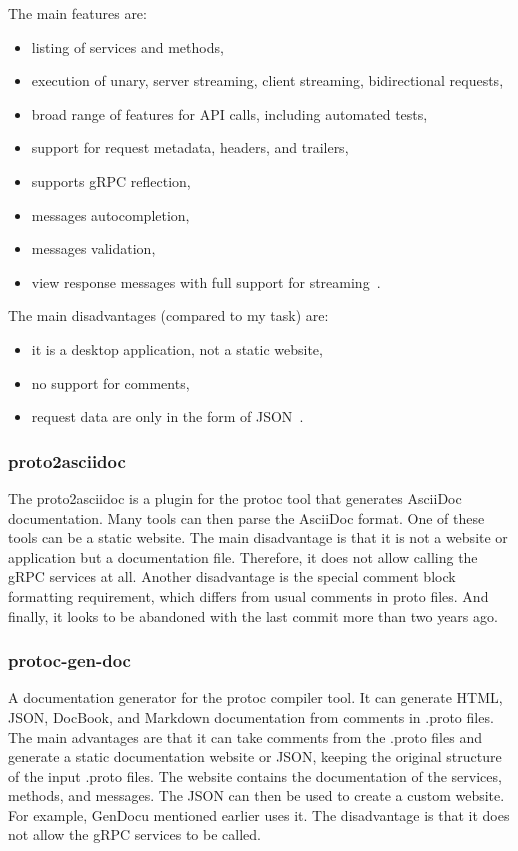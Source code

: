 The main features are:
\begin{itemize}
    \item listing of services and methods,
    \item execution of unary, server streaming, client streaming, bidirectional requests,
    \item broad range of features for API calls, including automated tests,
    \item support for request metadata, headers, and trailers,
    \item supports gRPC reflection,
    \item messages autocompletion,
    \item messages validation,
    \item view response messages with full support for streaming~\cite{postman}.
\end{itemize}

The main disadvantages (compared to my task) are:
\begin{itemize}
    \item it is a desktop application, not a static website,
    \item no support for comments,
    \item request data are only in the form of JSON~\cite{postman}.
\end{itemize}

\subsubsection{proto2asciidoc}
The proto2asciidoc is a plugin for the protoc tool that generates AsciiDoc documentation.
Many tools can then parse the AsciiDoc format.
One of these tools can be a static website.
The main disadvantage is that it is not a website or application but a documentation file.
Therefore, it does not allow calling the gRPC services at all.
Another disadvantage is the special comment block formatting requirement, which differs from usual comments in proto files.
And finally, it looks to be abandoned with the last commit more than two years ago.
\cite{grpc-proto2asciidoc}

\subsubsection{protoc-gen-doc}
A documentation generator for the protoc compiler tool.
It can generate HTML, JSON, DocBook, and Markdown documentation from comments in .proto files.
The main advantages are that it can take comments from the .proto files and generate a static documentation website or JSON, keeping the original structure of the input .proto files.
The website contains the documentation of the services, methods, and messages.
The JSON can then be used to create a custom website. For example, GenDocu mentioned earlier uses it.
The disadvantage is that it does not allow the gRPC services to be called.
\cite{grpc-protoc-gen-doc}

